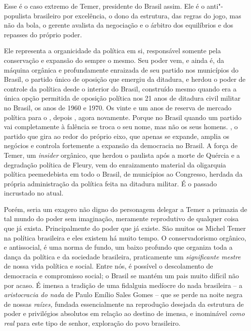 Esse é o caso extremo de Temer, presidente do Brasil assim.
Ele é o anti"-populista brasileiro por
excelência, o dono da estrutura, das regras do jogo, mas não da bola, o
gerente avalista da negociação e o árbitro dos equilíbrios e dos repasses do
próprio poder.

Ele representa a organicidade da política em si, responsável somente
pela conservação e expansão do sempre o mesmo. Seu poder vem, e ainda é,
da máquina orgânica e profundamente enraizada de seu partido nos municípios do Brasil,
o partido único de oposição que emergiu da ditadura, e herdou o poder de
controle da política desde o interior do Brasil, construído mesmo
quando era a única opção permitida de oposição política nos 21 anos de
ditadura civil militar no Brasil, os anos de 1960 e 1970. Os vinte e um anos de reserva de
mercado política para o , depois ,
agora  novamente. Porque no
Brasil quando um partido vai completamente à falência se troca o seu nome, mas não
os seus homens. , o partido que gira ao redor do próprio eixo, que
apenas se expande, amplia os negócios e controla fortemente a expansão
da democracia no Brasil. A força de Temer, um \emph{insider} orgânico,
que herdou o  paulista após a morte de Quércia e a degradação
política de Fleury, vem do enraizamento material da oligarquia política
peemedebista em todo o Brasil, de municípios ao Congresso, herdada da
própria administração da política feita na ditadura militar.
É o passado incrustado no atual.

Porém, seria um exagero não digno do personagem delegar a Temer a
primazia de tal mundo do poder sem imaginação, meramente reprodutivo de
qualquer coisa que já exista. Principalmente do poder que já existe. São
muitos os Michel Temer na política brasileira e eles existem há muito
tempo. O conservadorismo orgânico, e antissocial, é uma norma de fundo,
um baixo profundo que organiza toda a dança da política e da sociedade
brasileira, praticamente um \emph{significante mestre} de nossa vida
política e social. Entre nós, é possível o descolamento de democracia
e compromisso social; o Brasil se mantém um pais muito difícil não por
acaso. É imensa a tradição de uma fidalguia medíocre do nada brasileira
-- a \emph{aristocracia do nada} de Paulo Emílio Sales Gomes -- que se
perde na noite negra de nossas \emph{raízes,} fundada essencialmente na
reprodução desejada da estrutura de poder e privilégios absolutos em
relação ao destino de imensa, e inominável \emph{como real} para este
tipo de senhor, exploração do povo brasileiro.

